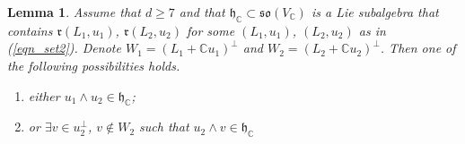 \documentclass[10pt,a4paper]{amsart}
\newtheorem{lem}{Lemma}
\newcommand{\bbC}{\mathbb{C}}
\newcommand{\frg}{\mathfrak{g}}
\newcommand{\frh}{\mathfrak{h}}
\newcommand{\frr}{\mathfrak{r}}
\newcommand{\frso}{\mathfrak{so}}
\renewcommand{\ge}{\geqslant}
\newcommand{\wdg}{\wedge}
\begin{document}
\begin{lem}\label{lem_dim2}
Assume that $d\ge 7$ and that $\frh_\bbC\subset\frso(V_\bbC)$ is a Lie subalgebra
that contains $\frr(L_1,u_1)$, $\frr(L_2,u_2)$ for some $(L_1,u_1)$, $(L_2,u_2)$
as in (\ref{eqn_set2}).
Denote $W_1 = (L_1 + \bbC u_1)^\perp$ and $W_2 = (L_2 + \bbC u_2)^\perp$.
Then one of the following possibilities holds.
\begin{enumerate}
\item either $u_1\wdg u_2\in \frh_\bbC$;
\item or $\exists v\in u_2^\perp$, $v\notin W_2$ such that $u_2\wdg v\in \frh_\bbC$
\end{enumerate}
\end{lem}
\end{document}
